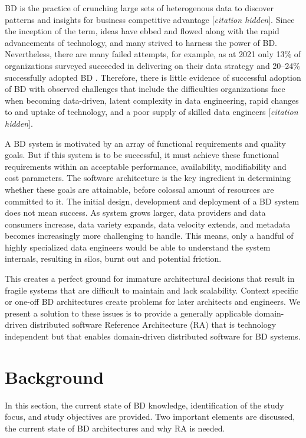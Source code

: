 \documentclass[a4paper,11pt]{article}
\let\cite\citep
\newcommand{\hc}{[\textit{citation hidden}]\textnormal{}}
\begin{document}
BD is the practice of crunching large sets of heterogenous data to discover patterns and insights for business competitive advantage 
\hc{}.
 Since the inception of the term, ideas have ebbed and flowed along with the rapid advancements of technology, and many strived to harness the power of BD. Nevertheless, there are many failed attempts, for example, as at 2021 only 13\%{} of organizations surveyed succeeded in delivering on their data strategy \cite{DataBricksSurvey} and 20--24\%{} successfully adopted BD \cite{NewVantageSurvey,GartnerSury}. Therefore, there is little evidence of successful adoption of BD with observed challenges that include the difficulties organizations face when becoming data-driven, latent complexity in data engineering, rapid changes to and uptake of technology, and a poor supply of skilled data engineers
\hc{}.  

A BD system is motivated by an array of functional requirements and quality goals. But if this system is to be successful, it must achieve these functional requirements within an acceptable performance, availability, modifiability and cost parameters. The software architecture is the key ingredient in determining whether these goals are attainable, before colossal amount of resources are committed to it. The initial design, development and deployment of a BD system does not mean success. As system grows larger, data providers and data consumers increase, data variety expands, data velocity extends, and metadata becomes increasingly more challenging to handle. This means, only a handful of highly specialized data engineers would be able to understand the system internals, resulting in silos, burnt out and potential friction.

This creates a perfect ground for immature architectural decisions that result in fragile systems that are difficult to maintain and lack scalability. Context specific or one-off BD architectures create problems for later architects and engineers. We present a solution to these issues is to provide a generally applicable domain-driven distributed software Reference Architecture (RA) that is technology independent but that enables domain-driven distributed software for BD systems.


\section{Background}
In this section, the current state of BD knowledge, identification of the study focus, and study objectives are provided. Two important elements are discussed, the current state of BD architectures and why RA is needed.
\end{document}
